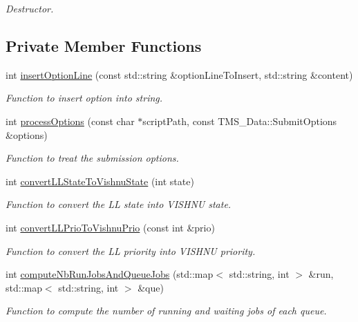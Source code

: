 \begin{DoxyCompactItemize}
\begin{DoxyCompactList}\small\item\em Destructor. \item\end{DoxyCompactList}\end{DoxyCompactItemize}
\subsection*{Private Member Functions}
\begin{DoxyCompactItemize}
\item 
int \hyperlink{classLLServer_a38af261c6159c2816f7eae22d6aaa31a}{insertOptionLine} (const std::string \&optionLineToInsert, std::string \&content)
\begin{DoxyCompactList}\small\item\em Function to insert option into string. \item\end{DoxyCompactList}\item 
int \hyperlink{classLLServer_a3128afe568dabc4b043ffffe48159652}{processOptions} (const char $\ast$scriptPath, const TMS\_\-Data::SubmitOptions \&options)
\begin{DoxyCompactList}\small\item\em Function to treat the submission options. \item\end{DoxyCompactList}\item 
int \hyperlink{classLLServer_a0691e56eda4540ad4379a60ce1e5f3f5}{convertLLStateToVishnuState} (int state)
\begin{DoxyCompactList}\small\item\em Function to convert the LL state into VISHNU state. \item\end{DoxyCompactList}\item 
int \hyperlink{classLLServer_a8649f7c42ad24f66215a63d12e2d54a6}{convertLLPrioToVishnuPrio} (const int \&prio)
\begin{DoxyCompactList}\small\item\em Function to convert the LL priority into VISHNU priority. \item\end{DoxyCompactList}\item 
int \hyperlink{classLLServer_af3ed7ec67ee318e43b9b8bb771cbc479}{computeNbRunJobsAndQueueJobs} (std::map$<$ std::string, int $>$ \&run, std::map$<$ std::string, int $>$ \&que)
\begin{DoxyCompactList}\small\item\em Function to compute the number of running and waiting jobs of each queue. \item\end{DoxyCompactList}\end{DoxyCompactItemize}
